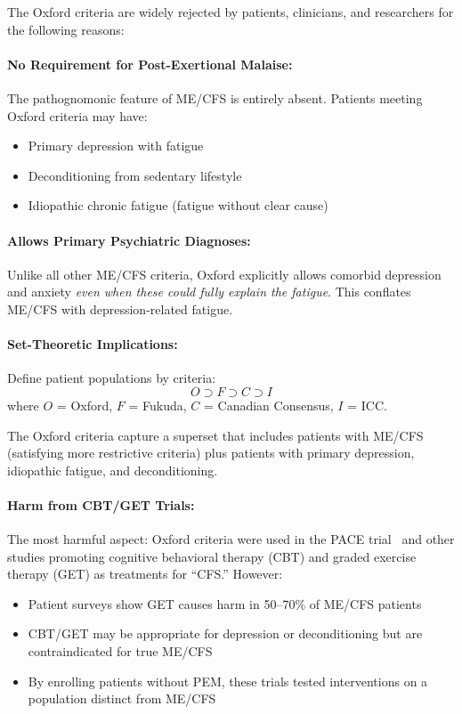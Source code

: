 \begin{warning}
\label{warn:oxford-problems}
The Oxford criteria are widely rejected by patients, clinicians, and researchers for the following reasons:

\paragraph{No Requirement for Post-Exertional Malaise:}
The pathognomonic feature of ME/CFS is entirely absent. Patients meeting Oxford criteria may have:
\begin{itemize}
    \item Primary depression with fatigue
    \item Deconditioning from sedentary lifestyle
    \item Idiopathic chronic fatigue (fatigue without clear cause)
\end{itemize}

\paragraph{Allows Primary Psychiatric Diagnoses:}
Unlike all other ME/CFS criteria, Oxford explicitly allows comorbid depression and anxiety \textit{even when these could fully explain the fatigue}. This conflates ME/CFS with depression-related fatigue.

\paragraph{Set-Theoretic Implications:}
Define patient populations by criteria:
\begin{equation}
O \supset F \supset C \supset I
\end{equation}
where $O$ = Oxford, $F$ = Fukuda, $C$ = Canadian Consensus, $I$ = ICC.

The Oxford criteria capture a superset that includes patients with ME/CFS (satisfying more restrictive criteria) plus patients with primary depression, idiopathic fatigue, and deconditioning.

\paragraph{Harm from CBT/GET Trials:}
The most harmful aspect: Oxford criteria were used in the PACE trial~\cite{White2011pace} and other studies promoting cognitive behavioral therapy (CBT) and graded exercise therapy (GET) as treatments for ``CFS.'' However:
\begin{itemize}
    \item Patient surveys show GET causes harm in 50--70\% of ME/CFS patients~\cite{MEAssociation2015survey}
    \item CBT/GET may be appropriate for depression or deconditioning but are contraindicated for true ME/CFS
    \item By enrolling patients without PEM, these trials tested interventions on a population distinct from ME/CFS
\end{itemize}
\end{warning}

